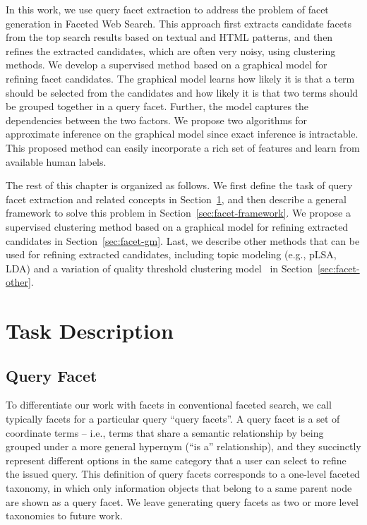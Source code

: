 In this work, we use query facet extraction to address the problem of facet generation in Faceted Web Search. This approach first extracts candidate facets from the top search results based on textual and HTML patterns, and then refines the extracted candidates, which are often very noisy, using clustering methods. We develop a supervised method based on a graphical model for refining facet candidates. The graphical model learns how likely it is that a term should be selected from the candidates and how likely it is that two terms should be grouped together in a query facet. Further, the model captures the dependencies between the two factors. We propose two algorithms for approximate inference on the graphical model since  exact inference is intractable. This proposed method can easily incorporate a rich set of features and learn from available human labels.

The rest of this chapter is organized as follows. We first define the task of query facet extraction and related concepts in Section~\ref{sec:facet-task}, and then describe a general framework to solve this problem in Section~\ref{sec:facet-framework}. We propose a supervised clustering method based on a graphical model for refining extracted candidates in Section~\ref{sec:facet-gm}. Last, we describe other methods that can be used for refining extracted candidates, including topic modeling (e.g., pLSA, LDA) and a variation of quality threshold clustering model~\cite{dou2011finding} in Section~\ref{sec:facet-other}. 

\section{Task Description}
\label{sec:facet-task}
\subsection{Query Facet}
To differentiate our work with facets in conventional faceted search, we call typically facets for a particular query ``query facets''. A query facet is a set of coordinate terms -- i.e., terms that share a semantic relationship by being grouped under a more general hypernym (``is a'' relationship), and they succinctly represent different options in the same category that a user can select to refine the issued query. This definition of query facets corresponds to a one-level faceted taxonomy, in which only information objects that belong to a same parent node are shown as a query facet. We leave generating query facets as two or more level taxonomies to future work.

